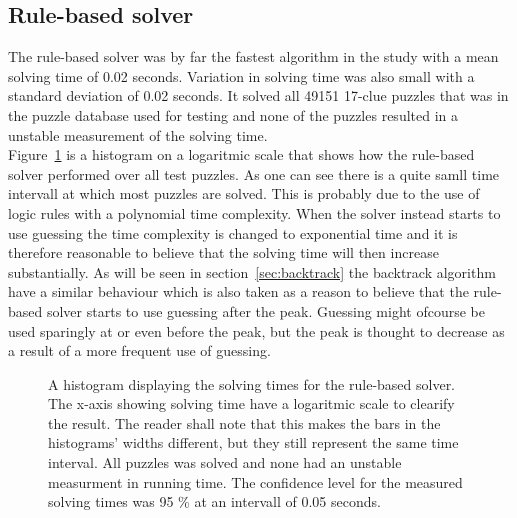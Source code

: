 \documentclass[a4paper,11pt]{kth-mag}
\begin{document}
\FloatBarrier
\subsection{Rule-based solver}
The rule-based solver was by far the fastest algorithm in the study with a mean solving time of 0.02 seconds.
Variation in solving time was also small with a standard deviation of 0.02 seconds. 
It solved all 49151 17-clue puzzles that was in the puzzle database used for testing and none of the puzzles resulted in a unstable measurement of the solving time.
\\
Figure~\ref{fig:rulebasedHistogram} is a histogram on a logaritmic scale that shows how the rule-based solver performed over all test puzzles.
As one can see there is a quite samll time intervall at which most puzzles are solved.
This is probably due to the use of logic rules with a polynomial time complexity.
When the solver instead starts to use guessing the time complexity is changed to exponential time and it is therefore reasonable to believe that the solving time will then increase substantially.
As will be seen in section~\ref{sec:backtrack} the backtrack algorithm have a similar behaviour which is also taken as a reason to believe that the rule-based solver starts to use guessing after the peak.
Guessing might ofcourse be used sparingly at or even before the peak, but the peak is thought to decrease as a result of a more frequent use of guessing.
\\
\begin{figure}[here] 
\noindent{}
\vspace{-25pt}
\caption{A histogram displaying the solving times for the rule-based solver. The x-axis showing solving time have a logaritmic scale to clearify the result. The reader shall note that this makes the bars in the histograms' widths different, but they still represent the same time interval. All puzzles was solved and none had an unstable measurment in running time. The confidence level for the measured solving times was 95 \% at an intervall of 0.05 seconds.}
\label{fig:rulebasedHistogram}
\end{figure}
\end{document}
